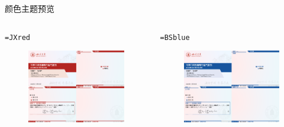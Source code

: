\begin{frame}{颜色主题预览 }\label{goto:ColorDisplay}
	\begin{columns}[T, onlytextwidth]
    \begin{column}{.5\textwidth}
       \texttt{=JXred}
      \begin{figure}[h]
        \centering
        \includegraphics[width=\columnwidth]{manual-sec/manual-demo/appendix-themescu-ColorDisplay-1.pdf}
      \end{figure}
    \end{column}
    \begin{column}{.5\textwidth}
       \texttt{=BSblue}
      \begin{figure}[h]
        \centering
        \includegraphics[width=\columnwidth]{manual-sec/manual-demo/appendix-themescu-ColorDisplay-2.pdf}
      \end{figure}
    \end{column}
  \end{columns}
\end{frame}


